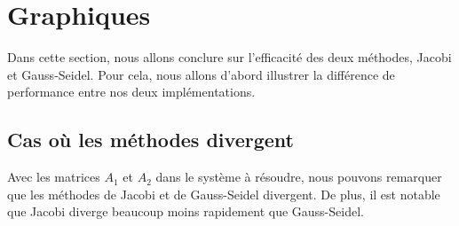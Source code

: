 




% 

\section{Graphiques}
Dans cette section, nous allons conclure sur l'efficacité des deux méthodes, Jacobi et Gauss-Seidel. Pour cela, nous allons d'abord illustrer la différence de performance entre nos deux implémentations.
\subsection{Cas où les méthodes divergent}
Avec les matrices $A_1$ et $A_2$ dans le système à résoudre, nous pouvons remarquer que les méthodes de Jacobi et de Gauss-Seidel divergent. De plus, il est notable que Jacobi diverge beaucoup moins rapidement que Gauss-Seidel.

